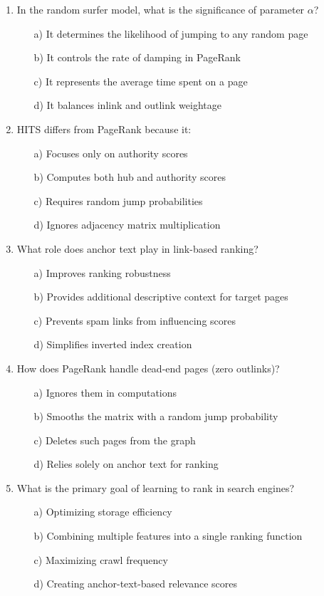\documentclass[8pt]{extarticle}
\begin{document}
\begin{multicols}{2}
\begin{enumerate}
\item In the random surfer model, what is the significance of parameter $\alpha$?
\begin{itemize}
\item[a)] It determines the likelihood of jumping to any random page
\item[b)] It controls the rate of damping in PageRank
\item[c)] It represents the average time spent on a page
\item[d)] It balances inlink and outlink weightage
\end{itemize}

\item HITS differs from PageRank because it:
\begin{itemize}
\item[a)] Focuses only on authority scores
\item[b)] Computes both hub and authority scores
\item[c)] Requires random jump probabilities
\item[d)] Ignores adjacency matrix multiplication
\end{itemize}

\item What role does anchor text play in link-based ranking?
\begin{itemize}
\item[a)] Improves ranking robustness
\item[b)] Provides additional descriptive context for target pages
\item[c)] Prevents spam links from influencing scores
\item[d)] Simplifies inverted index creation
\end{itemize}

\item How does PageRank handle dead-end pages (zero outlinks)?
\begin{itemize}
\item[a)] Ignores them in computations
\item[b)] Smooths the matrix with a random jump probability
\item[c)] Deletes such pages from the graph
\item[d)] Relies solely on anchor text for ranking
\end{itemize}

\item What is the primary goal of learning to rank in search engines?
\begin{itemize}
\item[a)] Optimizing storage efficiency
\item[b)] Combining multiple features into a single ranking function
\item[c)] Maximizing crawl frequency
\item[d)] Creating anchor-text-based relevance scores
\end{itemize}


\end{enumerate}
\end{multicols}
\end{document}
